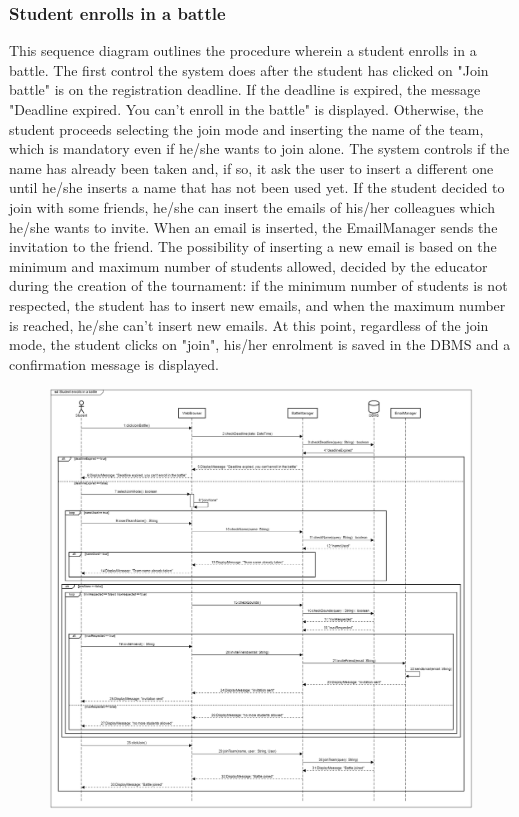 \documentclass[12pt,oneside,a4paper]{article}
\begin{document}
\subsubsection{Student enrolls in a battle}
This sequence diagram outlines the procedure wherein a student enrolls in a battle. The first control the system does after the student has clicked on "Join battle" is on the registration deadline. If the deadline is expired, the message "Deadline expired. You can't enroll in the battle" is displayed. Otherwise, the student proceeds selecting the join mode and inserting the name of the team, which is mandatory even if he/she wants to join alone. The system controls if the name has already been taken and, if so, it ask the user to insert a different one until he/she inserts a name that has not been used yet. If the student decided to join with some friends, he/she can insert the emails of his/her colleagues which he/she wants to invite. When an email is inserted, the EmailManager sends the invitation to the friend. The possibility of inserting a new email is based on the minimum and maximum number of students allowed, decided by the educator during the creation of the tournament: if the minimum number of students is not respected, the student has to insert new emails, and when the maximum number is reached, he/she can't insert new emails.
At this point, regardless of the join mode, the student clicks on "join", his/her enrolment is saved in the DBMS and a confirmation message is displayed.

\begin{figure}[htbp]
    \centering
    \includegraphics[width=1\linewidth]{Images//Sequence Diagrams/studentEnrollsBattle.png}
    \label{fig:enter-label}
\end{figure}
\clearpage
\end{document}
